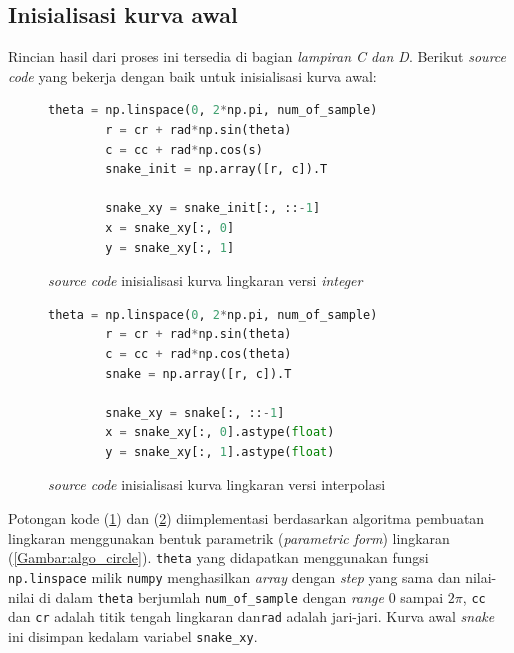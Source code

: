 \subsection{Inisialisasi kurva awal}
Rincian hasil dari proses ini tersedia di bagian \emph{lampiran C dan D}. Berikut \emph{source code} yang bekerja dengan baik untuk inisialisasi kurva awal:
\begin{figure}[H]
	\begin{lstlisting}[language=Python, basicstyle=\tiny]
		theta = np.linspace(0, 2*np.pi, num_of_sample)
		r = cr + rad*np.sin(theta)
		c = cc + rad*np.cos(s)
		snake_init = np.array([r, c]).T
		
		snake_xy = snake_init[:, ::-1]
		x = snake_xy[:, 0]
		y = snake_xy[:, 1]
	\end{lstlisting}
	\caption{\emph{source code} inisialisasi kurva lingkaran versi \emph{integer}}
	\label{Gambar:circle_integer}
\end{figure}
\begin{figure}[H]
	\begin{lstlisting}[language=Python, basicstyle=\tiny]
		theta = np.linspace(0, 2*np.pi, num_of_sample)
		r = cr + rad*np.sin(theta)
		c = cc + rad*np.cos(theta)
		snake = np.array([r, c]).T
		
		snake_xy = snake[:, ::-1]
		x = snake_xy[:, 0].astype(float)
		y = snake_xy[:, 1].astype(float)
	\end{lstlisting}
	\caption{\emph{source code} inisialisasi kurva lingkaran versi interpolasi}
	\label{Gambar:circle_float}
\end{figure}
Potongan kode (\ref{Gambar:circle_integer}) dan (\ref{Gambar:circle_float}) diimplementasi berdasarkan algoritma pembuatan lingkaran menggunakan bentuk parametrik (\emph{parametric form}) lingkaran (\ref{Gambar:algo_circle}). \texttt{theta} yang didapatkan menggunakan fungsi \texttt{np.linspace} milik \texttt{numpy} menghasilkan \emph{array} dengan \emph{step} yang sama dan nilai-nilai di dalam \texttt{theta} berjumlah \texttt{num\_of\_sample} dengan \emph{range} $0$ sampai $2 \pi$, \texttt{cc} dan \texttt{cr} adalah titik tengah lingkaran dan\texttt{rad} adalah jari-jari. Kurva awal \emph{snake} ini disimpan kedalam variabel \texttt{snake\_xy}.

